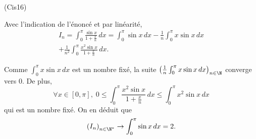 \begin{tiny}(Cis16)\end{tiny} Avec l'indication de l'énoncé et par linéarité,
\begin{multline*}
 I_n = 
\int_{0}^{\pi}\frac{ \sin x}{ 1 + \frac{x}{n}}\, dx
= \int_{0}^{\pi}\sin x\, dx -\frac{1}{n}\int_{0}^{\pi}x\sin x\, dx\\
+ \frac{1}{n^2} \int_{0}^{\pi} \frac{x^2 \sin x}{1 + \frac{x}{n}}\, dx.
\end{multline*}

Comme $\int_0^\pi x\sin x\,dx$ est un nombre fixé, la suite $\left(\frac{1}{n} \int_0^\pi x\sin x\,dx\right)_{n\in \N}$ converge vers $0$. De plus,
\[
\forall x\in [0,\pi], \; 0 \leq \int_{0}^{\pi} \frac{x^2 \sin x}{1 + \frac{x}{n}}\, dx 
\leq \int_{0}^{\pi} x^2 \sin x\, dx 
\]
qui est un nombre fixé. On en déduit que
\[
 \left( I_n \right)_{n \in \N^*} \rightarrow \int_{0}^{\pi}\sin x\, dx = 2.
\]
